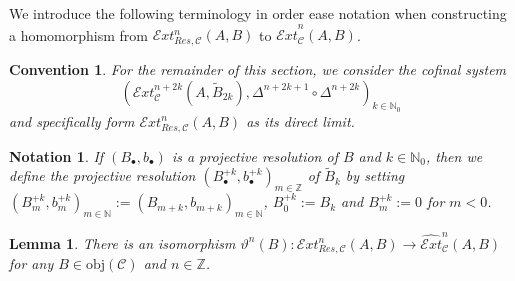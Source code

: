 \documentclass[12pt,a4paper]{article}
\numberwithin{equation}{section}
\newtheorem{lem}[thm]{Lemma}
\newtheorem{notn}[thm]{Notation}
\newtheorem{conv}[thm]{Convention}
\theoremstyle{nonumberplain}
\begin{document}
We introduce the following terminology in order ease notation when constructing a homomorphism from $\mathcal{E}xt_{Res, \mathcal{C}}^n(A, B)$ to $\widehat{\mathcal{E}xt}_{\mathcal{C}}^n(A, B)$.

\begin{conv}
For the remainder of this section, we consider the cofinal system
\[ (\mathcal{E}xt_{\mathcal{C}}^{n+2k}(A, \widetilde{B}_{2k}), \Delta^{n+2k+1} \circ \Delta^{n+2k})_{k \in \mathbb{N}_0} \]
and specifically form $\mathcal{E}xt_{Res, \mathcal{C}}^n(A, B)$ as its direct limit.
\end{conv}

\begin{notn}
If $(B_{\bullet}, b_{\bullet})$ is a projective resolution of $B$ and $k \in \mathbb{N}_0$, then we define the projective resolution $(B_{\bullet}^{+k}, b_{\bullet}^{+k})_{m \in \mathbb{Z}}$ of $\widetilde{B}_k$ by setting $(B_m^{+k}, b_m^{+k})_{m \in \mathbb{N}} := (B_{m+k}, b_{m+k})_{m \in \mathbb{N}}$, $B_0^{+k} := B_k$ and $B_m^{+k} := 0$ for $m < 0$.
\end{notn}

\begin{lem}\label{lem:vogelresol}
There is an isomorphism $\vartheta^n(B): \mathcal{E}xt_{Res, \mathcal{C}}^n(A, B) \rightarrow \widehat{\mathcal{E}xt}_{\mathcal{C}}^n(A, B)$ for any $B \in \mathrm{obj}(\mathcal{C})$ and $n \in \mathbb{Z}$.
\end{lem}
\end{document}
